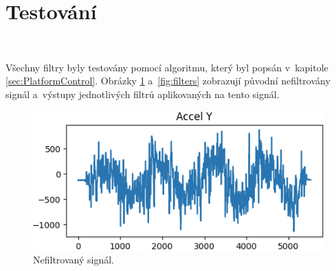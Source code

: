 \section{Testování}\

Všechny filtry byly testovány pomocí algoritmu, který byl popsán v~kapitole
\ref{sec:PlatformControl}. Obrázky \ref{fig:NoFilter} a~\ref{fig:filters} zobrazují
původní nefiltrovány signál a~výstupy jednotlivých filtrů aplikovaných na tento
signál.

\begin{figure}[!h]
	\centering
	\vspace{-5pt}
    \includegraphics[width = 0.7\linewidth]{Figures/NoFilter.png}
    \caption{Nefiltrovaný signál.}
    \label{fig:NoFilter}
    \vspace{-10pt}
\end{figure}

